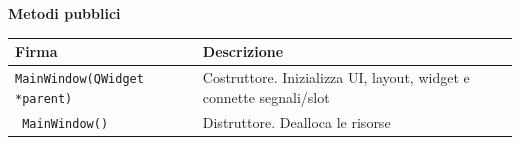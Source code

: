 \documentclass[a4paper,12pt]{article} %
\begin{document}
\textbf{Metodi pubblici}

\begin{tabular}{|p{6cm}|p{8.5cm}|}
\hline
\textbf{Firma} & \textbf{Descrizione} \\
\hline
\texttt{MainWindow(QWidget *parent)} & Costruttore. Inizializza UI, layout, widget e connette segnali/slot \\
\hline
\texttt{~MainWindow()} & Distruttore. Dealloca le risorse \\
\hline
\end{tabular}

\setlength{\parindent}{\oldparindent}
\end{document}
